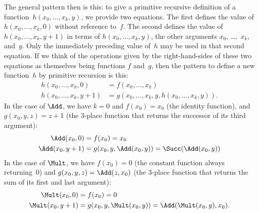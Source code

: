 \documentclass[../../../include/open-logic-section]{subfiles}
\begin{document}
The general pattern then is this: to give a primitive recursive
definition of a function~$h(x_0, \dots, x_k, y)$, we provide two
equations. The first defines the value of $h(x_0, \dots, x_k, 0)$
without reference to~$f$. The second defines the value of $h(x_0,
\dots, x_k, y+1)$ in terms of $h(x_0, \dots, x_k, y)$, the other
arguments $x_0$, \dots,~$x_k$, and~$y$. Only the immediately preceding
value of~$h$ may be used in that second equation.  If we think of the
operations given by the right-hand-sides of these two equations as
themselves being functions $f$ and~$g$, then the pattern to define a
new function~$h$ by primitive recursion is this:
\begin{align*}
  h(x_0, \dots, x_k, 0) & = f(x_0, \dots, x_k)\\
  h(x_0, \dots, x_k, y+1) & =
  g(x_0, \dots, x_k, y, h(x_0, \dots, x_k, y)).
\end{align*}  
In the case of $\Add$, we have $k=0$ and $f(x_0) = x_0$ (the
identity function), and $g(x_0, y, z) = z + 1$ (the $3$-place function
that returns the successor of its third argument):
\begin{align*}
  \Add(x_0, 0) & = f(x_0) = x_0\\
  \Add(x_0, y+1) & = g(x_0, y, \Add(x_0, y)) =
  \Succ(\Add(x_0, y))
\end{align*}
In the case of $\Mult$, we have $f(x_0) = 0$ (the constant
function always returning~$0$) and $g(x_0, y, z) = \Add(z,x_0)$
(the $3$-place function that returns the sum of its first and last
argument):
\begin{align*}
  \Mult(x_0,0) & =  f(x_0) = 0 \\
  \Mult(x_0,y+1) & =  g(x_0, y, \Mult(x_0,y)) =
  \Add(\Mult(x_0,y), x_0).
\end{align*}
\end{document}

